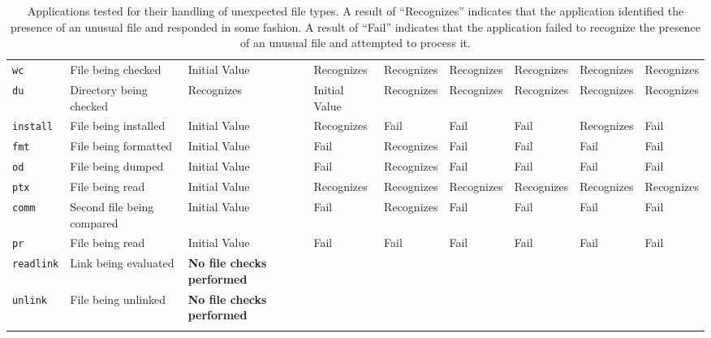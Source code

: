 \begin{table}[t]
\begin{tabular}{l  l  |  l  l  l  l  l  l  l}
        {\tt wc}          & File being checked         & Initial Value  & Recognizes     & Recognizes  & Recognizes & Recognizes  & Recognizes & Recognizes\\
        {\tt du}          & Directory being checked    & Recognizes     & Initial Value  & Recognizes  & Recognizes & Recognizes  & Recognizes & Recognizes\\
        {\tt install}     & File being installed       & Initial Value  & Recognizes     & Fail       & Fail      & Fail       & Recognizes & Fail\\
        {\tt fmt}         & File being formatted       & Initial Value  & Fail          & Recognizes  & Fail      & Fail       & Fail      & Fail\\
        {\tt od}          & File being dumped          & Initial Value  & Fail          & Recognizes  & Fail      & Fail       & Fail      & Fail\\
        {\tt ptx}         & File being read            & Initial Value  & Recognizes     & Recognizes  & Recognizes & Recognizes  & Recognizes & Recognizes\\
        {\tt comm}        & Second file being compared & Initial Value  & Fail           & Recognizes  & Fail       & Fail        & Fail       & Fail\\
        {\tt pr}          & File being read            & Initial Value  & Fail           & Fail        & Fail       & Fail        & Fail       & Fail\\
\hline
        {\tt readlink}    & Link being evaluated       & \textbf{No file checks performed} & & & & & & \\
        {\tt unlink}      & File being unlinked        & \textbf{No file checks performed} & & & & & & \\
    \bottomrule{}
    \end{tabular}
    \caption{Applications tested for their handling of unexpected file types.  A
    result of ``Recognizes'' indicates that the application identified the
    presence of an unusual file and responded in some fashion.  A result of
    ``Fail'' indicates that the application failed to recognize the presence of
    an unusual file and attempted to process it.}
    \label{table:unexpectedtypes}
\end{table}


